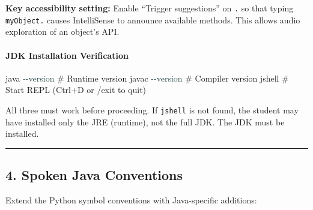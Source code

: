 \documentclass[
  justified,
  openright,
]{tufte-book}
\let\subsubsection\paragraph
\let\paragraph\paragraph
\newcommand{\AttributeTok}[1]{\textcolor{DarkSlateGray}{#1}}
\newcommand{\CommentTok}[1]{\textcolor{MidGray}{#1}}
\newcommand{\ExtensionTok}[1]{#1}
\newenvironment{Shaded}{%
  \begin{snugshade}
}{%
  \end{snugshade}
}
\let\subsubsection\paragraph
\let\paragraph\paragraph
\begin{document}
\textbf{Key accessibility setting:} Enable ``Trigger suggestions'' on
\texttt{.} so that typing \texttt{myObject.} causes IntelliSense to
announce available methods. This allows audio exploration of an object's
API.

\subsubsection{JDK Installation
Verification}\label{jdk-installation-verification}

\begin{Shaded}
\begin{Highlighting}[]
\ExtensionTok{java} \AttributeTok{{-}{-}version}      \CommentTok{\# Runtime version}
\ExtensionTok{javac} \AttributeTok{{-}{-}version}     \CommentTok{\# Compiler version}
\ExtensionTok{jshell}              \CommentTok{\# Start REPL (Ctrl+D or /exit to quit)}
\end{Highlighting}
\end{Shaded}

All three must work before proceeding. If \texttt{jshell} is not found,
the student may have installed only the JRE (runtime), not the full JDK.
The JDK must be installed.

\begin{center}\rule{0.5\linewidth}{0.5pt}\end{center}

\subsection{4. Spoken Java Conventions}\label{spoken-java-conventions}

Extend the Python symbol conventions with Java-specific additions:
\end{document}
